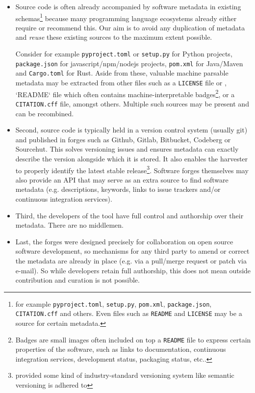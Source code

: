 \documentclass[a4paper,11pt]{article}
\begin{document}
\begin{itemize}

\item
Source code is often already accompanied by software metadata in existing
schemas\footnote{for example \texttt{pyproject.toml}, \texttt{setup.py}, \texttt{pom.xml}, \texttt{package.json}, \texttt{CITATION.cff} and others. Even files such as \texttt{README} and \texttt{LICENSE} may be a source for certain metadata.} because many programming language ecosystems already either require or
recommend this. Our aim is to avoid any duplication of metadata and
\emph{reuse} these existing sources to the maximum extent possible.

Consider
for example \texttt{pyproject.toml} or \texttt{setup.py} for Python projects,
\texttt{package.json} for javascript/npm/nodejs projects, \texttt{pom.xml} for
Java/Maven and \texttt{Cargo.toml} for Rust. Aside from these, valuable machine
parsable metadata may be extracted from other files such as a \texttt{LICENSE}
file or , `README` file which often contains machine-interpretable
badges\footnote{Badges are small images often included on top a \texttt{README}
file to express certain properties of the software, such as links to
documentation, continuous integration services, development status, packaging
status, etc..}, or a \texttt{CITATION.cff} file, amongst others. Multiple such
sources may be present and can be recombined.

\item 
  Second, source code 
  is typically held in a version control system (usually git) and published in 
  forges such as Github, Gitlab, Bitbucket, Codeberg or Sourcehut.
  This solves versioning issues and ensures metadata can exactly describe the version alongside which it is stored. It also enables the 
  harvester to properly identify the latest stable release\footnote{provided some kind of industry-standard versioning system like semantic versioning is adhered to}.
  Software forges themselves may also provide an API that may serve as an extra source to find software metadata (e.g. descriptions, keywords, links to issue trackers and/or continuous integration services).
\item 
  Third, the developers of the tool have full control and authorship over their metadata. There are no middlemen.
\item 
  Last, the forges were designed precisely for collaboration on open source software development, so mechanisms for any
  third party to amend or correct the metadata are already in place (e.g. via a pull/merge request or patch via e-mail).
  So while developers retain full authorship, this does not mean outside contribution and curation is not possible.
\end{itemize}
\end{document}
